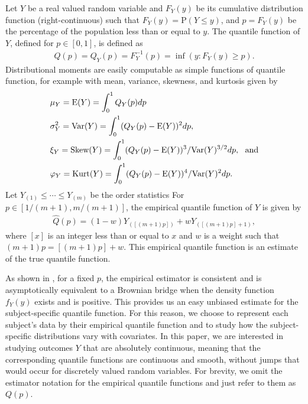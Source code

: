\documentclass[11pt]{article}
\begin{document}
Let $Y$ be a real valued random variable and $F_{Y}(y)$ be its 
cumulative distribution function (right-continuous) such that $F_{Y}(y)=\text{P}(Y\le y)$,
and $p=F_{Y}(y)$ be the percentage of the population less than or equal to $y$. 
The quantile function of $Y$, defined for $p \in [0,1]$,  is defined as
 \begin{align*}
Q(p)=Q_{Y}(p)=F_{Y}^{-1}(p)=\inf{(y: F_{Y}(y) \ge p     )}.
 \end{align*}
Distributional moments are easily computable as simple functions of quantile function, for example with mean, variance, skewness, and kurtosis given by 
 \begin{align}  \label{Quant_formula} 
&\mu_{Y}  =  \text{E}(Y)= 
\int_{0}^{1} Q_{Y}(p)  dp     \notag \\ 
&{\sigma}_{Y}^2 =  \text{Var}(Y)=  
 \int_{0}^{1}(Q_{Y}(p) -\text{E}(Y) )^2 dp,   \notag \\ 
 &{\xi}_{Y}=  \text{Skew}(Y)= 
\int_{0}^{1}(Q_{Y}(p) -\text{E}(Y))^3/\text{Var}(Y)^{3/2} dp, ~~\text{and}     \notag  \\ 
&{\varphi}_{Y}=    \text{Kurt}(Y)= 
\int_{0}^{1}(Q_{Y}(p) -\text{E}(Y))^4/\text{Var}(Y)^2 dp.   %
\end{align}
Let $Y_{(1)}\le \cdots\le Y_{(m)}$ be the order statistics 
 For $p \in [1/(m+1),m/(m+1)]$, the empirical quantile function of $Y$ is given by
  \begin{align*}
\widehat{Q}(p) =  (1-w)Y_{([(m+1)p])} + wY_{([(m+1)p]+1)},
 \end{align*}
 where 
 $[x]$ is an integer less than or equal to $x$
 and  $w$ is a weight such that $(m+1)p=[(m+1)p]+w$.
This empirical quantile function is an estimate of the true quantile function.

 As shown in \cite{parzen2004quantile}, for a fixed $p$, the empirical estimator  
is consistent and is asymptotically equivalent to a Brownian bridge 
when the density function $f_{Y}(y)$ exists and is positive.  This provides us an easy unbiased estimate for the subject-specific quantile function.
For this reason, we choose to represent each subject's data by their empirical quantile function and to study how the subject-specific distributions vary with covariates.  
In this paper, we are interested in studying outcomes $Y$ that are absolutely continuous, meaning that the corresponding quantile functions are continuous and smooth, without jumps that would occur for discretely valued random variables.
 For brevity, we omit the estimator notation for the empirical quantile functions and just refer to them as 
 $Q(p)$. 
\end{document}

